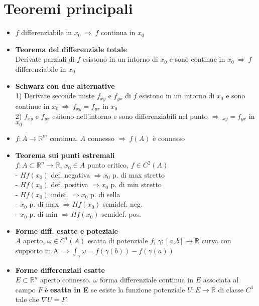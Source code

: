 \documentclass[a4paper,portrait,columns=3,5pt]{cheatsheet}
\begin{document}
\section{Teoremi principali}
\begin{itemize}
	\item $f$ differenziabile in $x_0~ \Rightarrow~f$ continua in $x_0 $
	\item \textbf{Teorema del differenziale totale} \\ Derivate parziali di $f$ esistono in un intorno di $x_0$ e sono continue in $x_0~\Rightarrow ~ f$ differenziabile in $x_0$ 
	\item \textbf{Schwarz con due alternative} \\ 1) Derivate seconde miste $f_{xy}$ e $f_{yx}$ di $f$ esistono in un intorno di $x_0$ e sono continue in $x_0~\Rightarrow~f_{xy} = f_{yx}$ in $x_0$
			\\ 2) $f_{xy}$ e $f_{yx}$ esitono nell'intorno e sono differenziabili nel punto $\Rightarrow~_{xy} = f_{yx}$ in $x_0$
	\item $f : A \rightarrow \mathbb{R}^m$ continua, $A$ connesso $\Rightarrow~f(A)$ è connesso
	\item \textbf{Teorema sui punti estremali}\\
			$f:A\subset \mathbb{R}^n \rightarrow \mathbb{R}$, $x_0 \in A$ punto critico, $f\in C^2(A)$\\
			- $Hf(x_0)$ def. negativa $\Rightarrow x_0$ p. di max stretto \\
			- $Hf(x_0)$ def. positiva $\Rightarrow x_0$ p. di min stretto \\
			- $Hf(x_0)$ indef. $\Rightarrow x_0$ p. di sella\\
			- $x_0$ p. di max $\Rightarrow Hf(x_0)$ semidef. neg.\\
			- $x_0$ p. di min $\Rightarrow Hf(x_0)$ semidef. pos.
	\item \textbf{Forme diff. esatte e poteziale}\\
			$A$ aperto, $\omega\in C^1(A)$ esatta di potenziale $f$, $\gamma :[a,b]\rightarrow \mathbb{R}$ curva con supporto in A 
			$\Rightarrow \int_\gamma \omega = f(\gamma(b)) - f(\gamma(a))$
	\item \textbf{Forme differenziali esatte} \\
			$E \subset \mathbb{R}^n$ aperto connesso. $\omega$ forma differenziale continua in $E$ associata al campo $F$ è \textbf{esatta in E} se esiste la funzione potenziale $U: E \to \mathbb{R}$ di classe $C^1$ tale che $\nabla U = F$.
			

\end{itemize}
\end{document}
